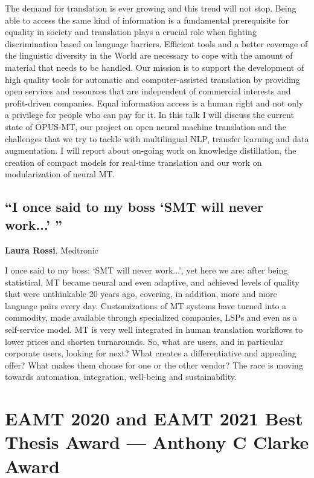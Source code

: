 \documentclass[a4paper,11pt,twoside]{book}
\begin{document}
The demand for translation is ever growing and this trend will not stop. Being able to access the same kind of information is a fundamental prerequisite for equality in society and translation plays a crucial role when fighting discrimination based on language barriers. Efficient tools and a better coverage of the linguistic diversity in the World are necessary to cope with the amount of material that needs to be handled. Our mission is to support the development of high quality tools for automatic and computer-assisted translation by providing open services and resources that are independent of commercial interests and profit-driven companies. Equal information access is a human right and not only a privilege for people who can pay for it. In this talk I will discuss the current state of OPUS-MT, our project on open neural machine translation and the challenges that we try to tackle with multilingual NLP, transfer learning and data augmentation. I will report about on-going work on knowledge distillation, the creation of compact models for real-time translation and our work on modularization of neural MT.


\section*{``I once said to my boss `SMT will never work...' ''}
\textbf{Laura Rossi}, Medtronic 
\vspace{0.5cm}

I once said to my boss: `SMT will never work...', yet here we are: after being statistical, MT became neural and even adaptive, and achieved levels of quality that were unthinkable 20 years ago, covering, in addition, more and more language pairs every day. Customizations of MT systems have turned into a commodity, made available through specialized companies, LSPs and even as a self-service model. MT is very well integrated in human translation workflows to lower prices and shorten turnarounds. So, what are users, and in particular corporate users, looking for next? What creates a differentiative and appealing offer? What makes them choose for one or the other vendor? The race is moving towards automation, integration, well-being and sustainability.


\chapter*{EAMT 2020 and EAMT 2021 Best Thesis Award — Anthony C Clarke Award}
\end{document}
